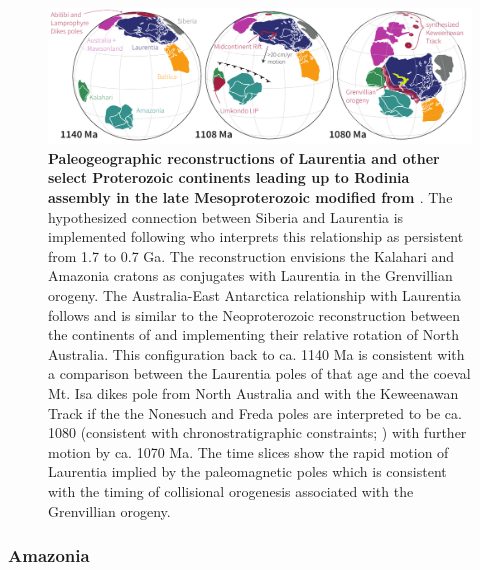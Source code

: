 \documentclass[twocolumn, switch]{article} %
\begin{document}
\begin{figure}
\centering
\includegraphics[width=\textwidth]{../Figures/Grenville_Reconstruction.pdf}
\caption{\textbf{Paleogeographic reconstructions of Laurentia and other select Proterozoic continents leading up to Rodinia assembly in the late Mesoproterozoic modified from \cite{Swanson-Hysell2019a}}. The hypothesized connection between Siberia and Laurentia is implemented following \cite{Evans2016b} who interprets this relationship as persistent from 1.7 to 0.7 Ga. The reconstruction envisions the Kalahari and Amazonia cratons as conjugates with Laurentia in the Grenvillian orogeny. The Australia-East Antarctica relationship with Laurentia follows \cite{Swanson-Hysell2012a} and is similar to the Neoproterozoic reconstruction between the continents of \cite{Li2011a} and implementing their relative rotation of North Australia. This configuration back to ca. 1140 Ma is consistent with a comparison between the Laurentia poles of that age and the coeval Mt. Isa dikes pole from North Australia and with the Keweenawan Track if the the Nonesuch and Freda poles are interpreted to be ca. 1080 (consistent with chronostratigraphic constraints; \citealp{Slotznick2018a}) with further motion by ca. 1070 Ma. The time slices show the rapid motion of Laurentia implied by the paleomagnetic poles which is consistent with the timing of collisional orogenesis associated with the Grenvillian orogeny.}
\label{fig:Grenville_reconstructions}
\end{figure}

\subsubsection{Amazonia}
\end{document}
